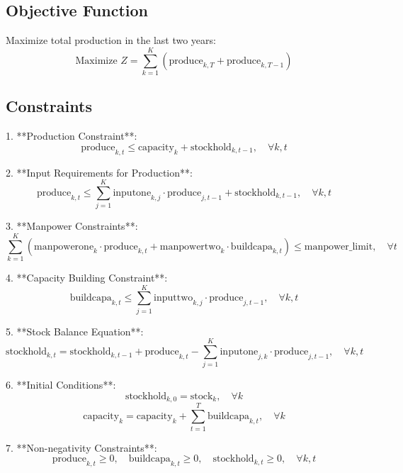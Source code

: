 \documentclass{article}
\begin{document}
\subsection*{Objective Function}
Maximize total production in the last two years:
\[
\text{Maximize } Z = \sum_{k=1}^{K} \left( \text{produce}_{k, T} + \text{produce}_{k, T-1} \right)
\]

\subsection*{Constraints}

1. **Production Constraint**:
\[
\text{produce}_{k, t} \leq \text{capacity}_{k} + \text{stockhold}_{k, t-1}, \quad \forall k, t
\]

2. **Input Requirements for Production**:
\[
\text{produce}_{k, t} \leq \sum_{j=1}^{K} \text{inputone}_{k,j} \cdot \text{produce}_{j, t-1} + \text{stockhold}_{k, t-1}, \quad \forall k, t
\]

3. **Manpower Constraints**:
\[
\sum_{k=1}^{K} \left( \text{manpowerone}_{k} \cdot \text{produce}_{k, t} + \text{manpowertwo}_{k} \cdot \text{buildcapa}_{k, t} \right) \leq \text{manpower\_limit}, \quad \forall t
\]

4. **Capacity Building Constraint**:
\[
\text{buildcapa}_{k, t} \leq \sum_{j=1}^{K} \text{inputtwo}_{k,j} \cdot \text{produce}_{j, t-1}, \quad \forall k, t
\]

5. **Stock Balance Equation**:
\[
\text{stockhold}_{k, t} = \text{stockhold}_{k, t-1} + \text{produce}_{k, t} - \sum_{j=1}^{K} \text{inputone}_{j,k} \cdot \text{produce}_{j, t-1}, \quad \forall k, t
\]

6. **Initial Conditions**:
\[
\text{stockhold}_{k, 0} = \text{stock}_{k}, \quad \forall k
\]
\[
\text{capacity}_{k} = \text{capacity}_{k} + \sum_{t=1}^{T} \text{buildcapa}_{k, t}, \quad \forall k
\]

7. **Non-negativity Constraints**:
\[
\text{produce}_{k, t} \geq 0, \quad \text{buildcapa}_{k, t} \geq 0, \quad \text{stockhold}_{k, t} \geq 0, \quad \forall k, t
\]
\end{document}
